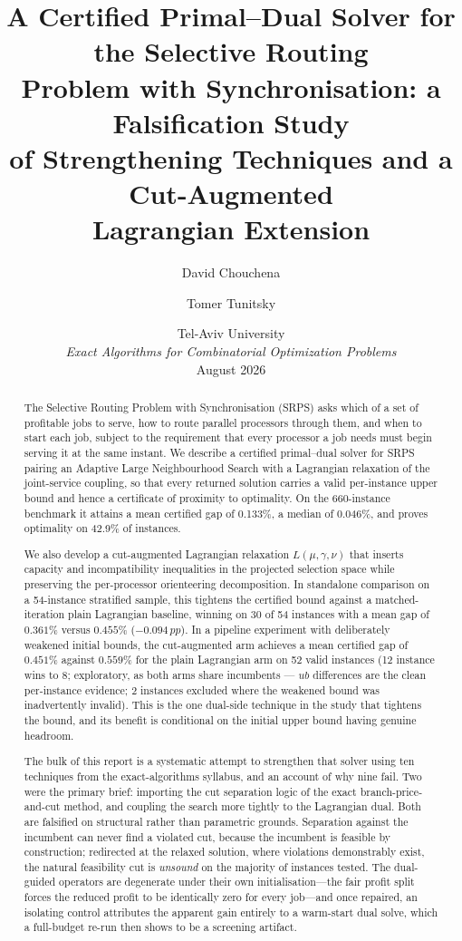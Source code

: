 \documentclass[11pt,a4paper]{article}
\title{A Certified Primal--Dual Solver for the Selective Routing\\
Problem with Synchronisation: a Falsification Study\\
of Strengthening Techniques and a Cut-Augmented\\
Lagrangian Extension}
\author{David Chouchena \and Tomer Tunitsky}
\date{%
  Tel-Aviv University\\[2pt]
  \emph{Exact Algorithms for Combinatorial Optimization Problems}\\[8pt]
  August 2026
}
\newcommand{\pp}{\,pp}
\begin{document}
\maketitle

\begin{abstract}
The Selective Routing Problem with Synchronisation (SRPS) asks which of a set of
profitable jobs to serve, how to route parallel processors through them, and when
to start each job, subject to the requirement that every processor a job needs
must begin serving it at the same instant. We describe a certified primal--dual
solver for SRPS pairing an Adaptive Large Neighbourhood Search with a Lagrangian
relaxation of the joint-service coupling, so that every returned solution carries
a valid per-instance upper bound and hence a certificate of proximity to
optimality. On the 660-instance benchmark it attains a mean certified gap of
0.133\%, a median of 0.046\%, and proves optimality on 42.9\% of instances.

We also develop a cut-augmented Lagrangian relaxation $L(\mu,\gamma,\nu)$ that
inserts capacity and incompatibility inequalities in the projected selection
space while preserving the per-processor orienteering decomposition. In
standalone comparison on a 54-instance stratified sample, this tightens the
certified bound against a matched-iteration plain Lagrangian baseline, winning on
30 of 54 instances with a mean gap of $0.361\%$ versus $0.455\%$ ($-0.094\pp$).
In a pipeline experiment with deliberately weakened initial bounds, the
cut-augmented arm achieves a mean certified gap of $0.451\%$ against $0.559\%$
for the plain Lagrangian arm on 52 valid instances (12 instance wins to 8;
exploratory, as both arms share incumbents --- $ub$ differences are the clean
per-instance evidence; 2 instances excluded where the weakened bound was
inadvertently invalid).  This is the one dual-side technique in the study that
tightens the bound, and its benefit is conditional on the initial upper bound
having genuine headroom.

The bulk of this report is a systematic attempt to strengthen that solver using
ten techniques from the exact-algorithms syllabus, and an account of why nine
fail. Two were the primary brief: importing the cut separation logic of the exact
branch-price-and-cut method, and coupling the search more tightly to the
Lagrangian dual. Both are falsified on structural rather than parametric grounds.
Separation against the incumbent can never find a violated cut, because the
incumbent is feasible by construction; redirected at the relaxed solution, where
violations demonstrably exist, the natural feasibility cut is \emph{unsound} on
the majority of instances tested. The dual-guided operators are degenerate under
their own initialisation---the fair profit split forces the reduced profit to be
identically zero for every job---and once repaired, an isolating control
attributes the apparent gain entirely to a warm-start dual solve, which a
full-budget re-run then shows to be a screening artifact.


\end{abstract}
\end{document}
